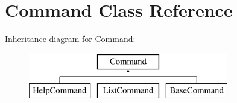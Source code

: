 \hypertarget{class_symfony_1_1_components_1_1_console_1_1_command_1_1_command}{
\section{Command Class Reference}
\label{class_symfony_1_1_components_1_1_console_1_1_command_1_1_command}
}
Inheritance diagram for Command:\begin{figure}[H]
\begin{center}
\leavevmode
\includegraphics[height=2.000000cm]{class_symfony_1_1_components_1_1_console_1_1_command_1_1_command}
\end{center}
\end{figure}
